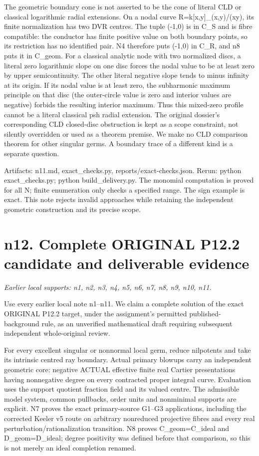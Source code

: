 \documentclass[11pt]{article}
\begin{document}
The geometric boundary cone is not asserted to be the cone of literal CLD or classical logarithmic radial extensions. On a nodal curve R=k[x,y]\_(x,y)/(xy), its finite normalization has two DVR centres. The tuple (-1,0) is in C\_S and is fibre compatible: the conductor has finite positive value on both boundary points, so its restriction has no identified pair. N4 therefore puts (-1,0) in C\_R, and n8 puts it in C\_geom. For a classical analytic node with two normalized discs, a literal zero logarithmic slope on one disc forces the nodal value to be at least zero by upper semicontinuity. The other literal negative slope tends to minus infinity at its origin. If its nodal value is at least zero, the subharmonic maximum principle on that disc (the outer-circle value is zero and interior values are negative) forbids the resulting interior maximum. Thus this mixed-zero profile cannot be a literal classical psh radial extension. The original dossier's corresponding CLD closed-disc obstruction is kept as a scope constraint, not silently overridden or used as a theorem premise. We make no CLD comparison theorem for other singular germs. A boundary trace of a different kind is a separate question.

Artifacts: n11.md, exact\_checks.py, reports/exact-checks.json. Rerun: python exact\_checks.py; python build\_delivery.py. The monomial computation is proved for all N; finite enumeration only checks a specified range. The sign example is exact. This note rejects invalid approaches while retaining the independent geometric construction and its precise scope.

\section{n12. Complete ORIGINAL P12.2 candidate and deliverable evidence}
\textit{Earlier local supports: n1, n2, n3, n4, n5, n6, n7, n8, n9, n10, n11.}

Use every earlier local note n1--n11. We claim a complete solution of the exact ORIGINAL P12.2 target, under the assignment's permitted published-background rule, as an unverified mathematical draft requiring subsequent independent whole-original review.

For every excellent singular or nonnormal local germ, reduce nilpotents and take its intrinsic centred ray boundary. Actual primary blowups carry an independent geometric core: negative ACTUAL effective finite real Cartier presentations having nonnegative degree on every contracted proper integral curve. Evaluation uses the support quotient fraction field and its valued centre. The admissible model system, common pullbacks, order units and nonminimal supports are explicit. N7 proves the exact primary-source G1--G3 applications, including the corrected Keeler v5 route on arbitrary nonreduced projective fibres and every real perturbation/rationalization transition. N8 proves C\_geom=C\_ideal and D\_geom=D\_ideal; degree positivity was defined before that comparison, so this is not merely an ideal completion renamed.
\end{document}
